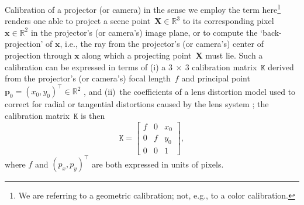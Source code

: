 \documentclass[review]{elsarticle}
\begin{document}
Calibration of a projector (or camera) in the sense we employ the term here\footnote{We are referring to a geometric calibration; not, e.g., to a color calibration.} renders one able to project a scene point~$\mathbf{X} \in \mathbb{R}^3$ to its corresponding pixel~$\mathbf{x} \in \mathbb{R}^2$ in the projector's (or camera's) image plane, or to compute the `back-projection' of $\mathbf{x}$, i.e., the ray from the projector's (or camera's) center of projection through $\mathbf{x}$ along which a projecting point~$\mathbf{X}$ must lie. Such a calibration can be expressed in terms of (i) a $3~\times{}~3$ calibration matrix~$\mathtt{K}$ derived from the projector's (or camera's) focal length~$f$ and principal point~$\mathbf{p}_0 = (x_0, y_0)^\top \in \mathbb{R}^2$ \cite{Hartley2004}, and (ii)~the coefficients of a lens distortion model used to correct for radial or tangential distortions caused by the lens system \cite{duane1971close,weng1992camera}; the calibration matrix~$\mathtt{K}$ is then
\begin{equation}
\mathtt{K} = \begin{bmatrix}
f & 0 & x_0 \\
0 & f & y_0 \\
0 & 0 & 1
\end{bmatrix},
\end{equation}
where $f$ and $(p_x, p_y)^\top$ are both expressed in units of pixels.
\end{document}
